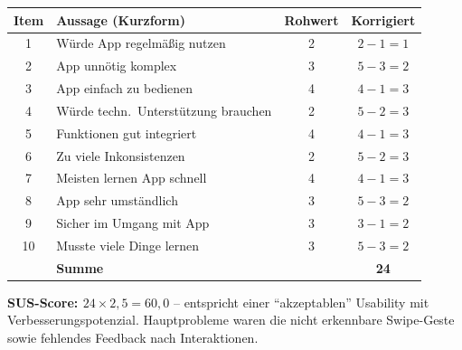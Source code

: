 \documentclass{article}
\begin{document}
\begin{tabular}{@{}clcc@{}}
  \hline
  \textbf{Item} & \textbf{Aussage (Kurzform)} & \textbf{Rohwert} & \textbf{Korrigiert} \\
  \hline
  1  & Würde App regelmäßig nutzen          & 2 & $2-1=1$ \\
  2  & App unnötig komplex                  & 3 & $5-3=2$ \\
  3  & App einfach zu bedienen              & 4 & $4-1=3$ \\
  4  & Würde techn.\ Unterstützung brauchen & 2 & $5-2=3$ \\
  5  & Funktionen gut integriert            & 4 & $4-1=3$ \\
  6  & Zu viele Inkonsistenzen              & 2 & $5-2=3$ \\
  7  & Meisten lernen App schnell           & 4 & $4-1=3$ \\
  8  & App sehr umständlich                 & 3 & $5-3=2$ \\
  9  & Sicher im Umgang mit App             & 3 & $3-1=2$ \\
  10 & Musste viele Dinge lernen            & 3 & $5-3=2$ \\
  \hline
     & \textbf{Summe}                       &   & \textbf{24} \\
  \hline
\end{tabular}

\medskip
\textbf{SUS-Score: $24 \times 2{,}5 = 60{,}0$} –
entspricht einer \enquote{akzeptablen} Usability mit Verbesserungspotenzial.
Hauptprobleme waren die nicht erkennbare Swipe-Geste sowie fehlendes
Feedback nach Interaktionen.

%
%
\setcounter{page}{1} %
%
\newpage
%
%
%
\end{document}
